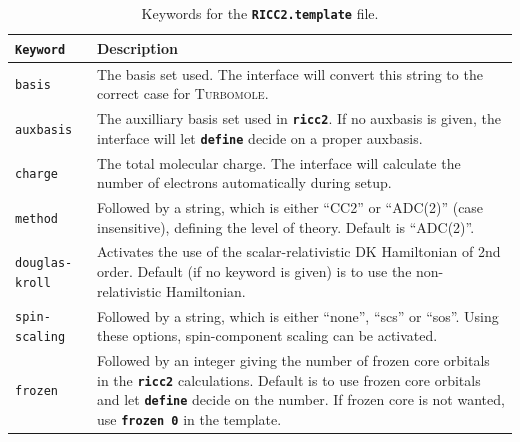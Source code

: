 \documentclass[a4paper,11pt,DIV=15,openany,twoside=false]{scrbook}
\newcommand{\ttt}[1]{\textbf{\texttt{#1}}}
\begin{document}
\begin{table}
  \centering
  \caption{Keywords for the \ttt{RICC2.template} file.}
  \label{tab:ricc2_temp}
  \begin{tabular}{>{\tt}lp{12cm}}
  \toprule
  Keyword       &Description\\
  \midrule
basis           &The basis set used. The interface will convert this string to the correct case for \textsc{Turbomole}.\\
auxbasis        &The auxilliary basis set used in \ttt{ricc2}. If no auxbasis is given, the interface will let \ttt{define} decide on a proper auxbasis.\\
charge          &The total molecular charge. The interface will calculate the number of electrons automatically during setup.\\
method          &Followed by a string, which is either ``CC2'' or ``ADC(2)'' (case insensitive), defining the level of theory. Default is ``ADC(2)''.\\
douglas-kroll   &Activates the use of the scalar-relativistic DK Hamiltonian of 2nd order. Default (if no keyword is given) is to use the non-relativistic Hamiltonian.\\
spin-scaling    &Followed by a string, which is either ``none'', ``scs'' or ``sos''. Using these options, spin-component scaling can be activated.\\
frozen          &Followed by an integer giving the number of frozen core orbitals in the \ttt{ricc2} calculations. Default is to use frozen core orbitals and let \ttt{define} decide on the number. If frozen core is not wanted, use \ttt{frozen 0} in the template.\\
  \bottomrule
  \end{tabular}
\end{table}





























\end{document}
